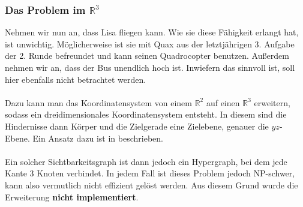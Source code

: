 \documentclass[a4paper, notitlepage, 12pt]{scrartcl}
\begin{document}
 \subsubsection{Das Problem im $\mathbb{R}^{3}$}
 Nehmen wir nun an, dass Lisa fliegen kann. Wie sie diese Fähigkeit erlangt hat, ist unwichtig. Möglicherweise ist sie mit Quax aus der letztjährigen 3. Aufgabe der 2. Runde befreundet und kann seinen Quadrocopter benutzen. Außerdem nehmen wir an, dass der Bus unendlich hoch ist. Inwiefern das sinnvoll ist, soll hier ebenfalls nicht betrachtet werden. \\ \\
 Dazu kann man das Koordinatensystem von einem $\mathbb{R}^{2}$ auf einen $\mathbb{R}^{3}$ erweitern, sodass ein dreidimensionales Koordinatensystem entsteht. In diesem sind die Hindernisse dann Körper und die Zielgerade eine Zielebene, genauer die $yz$-Ebene. Ein Ansatz dazu ist in \cite{Src:3dvis} beschrieben. \\ \\
 Ein solcher Sichtbarkeitsgraph ist dann jedoch ein Hypergraph, bei dem jede Kante 3 Knoten verbindet. In jedem Fall ist dieses Problem jedoch NP-schwer, kann also vermutlich nicht effizient gelöst werden.\cite{Src:3dhard} Aus diesem Grund wurde die Erweiterung \textbf{nicht implementiert}. 
\end{document}
